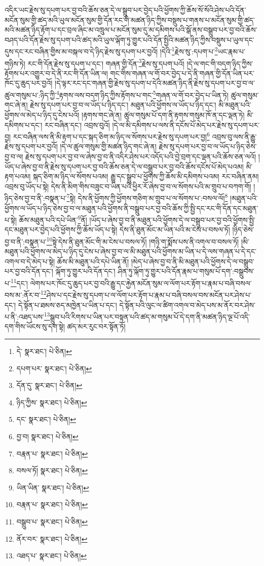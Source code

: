 འདིར་ཡང་རྗེས་སུ་དཔག་པར་བྱ་བའི་ཆོས་ཅན་དེ་ལ་སྒྲུབ་པར་བྱེད་པའི་ཕྱོགས་ཀྱི་ཆོས་སོ་སོའི་ཤེས་པའི་དོན་མངོན་སུམ་གྱི་ཚད་མའི་ཡུལ་མངོན་སུམ་གྱི་དོན་རང་གི་མཚན་ཉིད་ཀྱིས་བསྡུས་པ་གནས་པ་མངོན་སུམ་གྱི་ཚད་མའི་མཚན་ཉིད་རྟོག་པ་དང་བྲལ་ཞིང་མ་འཁྲུལ་པ་མངོན་སུམ་དུ་མ་དམིགས་པའི་སྒོ་ནས་བསྒྲུབ་པར་བྱ་བའི་ཆོས་བཤད་པའི་དོན་རྗེས་སུ་དཔག་པའི་ཚད་མའི་ཡུལ་ལྐོག་ཏུ་གྱུར་པའི་དོན་སྤྱིའི་མཚན་ཉིད་ཀྱིས་བསྡུས་པ་ཡུལ་དང་དུས་དང་རང་བཞིན་གྱིས་མ་བསྐལ་བ་དེ་ཉིད་རྗེས་སུ་དཔག་པར་བྱའོ། །དེའི་\footnote{དེ་  སྣར་ཐང་།  པེ་ཅིན། }རྗེས་སུ་:དཔག་པ་\footnote{དཔག་པར་  སྣར་ཐང་།  པེ་ཅིན། }ཡང་རྣམ་པ་གཉིས་ཏེ། རང་གི་དོན་རྗེས་སུ་དཔག་པ་དང་། གཞན་གྱི་དོན་\footnote{དོན་དུ་  སྣར་ཐང་།  པེ་ཅིན། }རྗེས་སུ་དཔག་པའོ། །དེ་ལ་གང་གི་བདག་ཉིད་ཀྱིས་རྟོགས་པར་འགྱུར་བ་དེ་ནི་རང་གི་དོན་ཡིན་ལ། གང་གིས་གཞན་ལ་གོ་བར་བྱེད་པ་དེ་ནི་གཞན་གྱི་དོན་ཡིན་པར་ཁོང་དུ་ཆུད་པར་བྱའོ། །དེ་ལྟར་རང་དང་གཞན་གྱི་རྗེས་སུ་དཔག་པ་དེའི་མཚན་ཉིད་ནི་རྗེས་སུ་དཔག་པར་བྱ་བ་ལ་ཚུལ་གསུམ་པ་:ཉིད་ཀྱི་\footnote{ཉིད་ཀྱིས་  སྣར་ཐང་།  པེ་ཅིན། }རྟགས་ལས་བདག་ཉིད་ཀྱིས་རྟོགས་པ་གང་\footnote{དང་  སྣར་ཐང་།  པེ་ཅིན། }གཞན་ལ་གོ་བར་བྱེད་པ་ཡིན་ཏེ། ཚུལ་གསུམ་གང་ཞེ་ན། རྗེས་སུ་དཔག་པར་བྱ་བ་ལ་ཡོད་པ་ཉིད་དང་། མཐུན་པའི་ཕྱོགས་ལ་ཡོད་པ་ཉིད་དང་། མི་མཐུན་པའི་ཕྱོགས་ལ་མེད་པ་ཉིད་དུ་ངེས་པའོ། །རྟགས་གང་ཞེ་ན། ཚུལ་གསུམ་པོ་དག་ནི་རྟགས་གསུམ་ཁོ་ན་དང་ལྡན་ཏེ། མི་དམིགས་པ་དང་། རང་བཞིན་དང་། འབྲས་བུའོ། །དེ་ལ་མི་དམིགས་པ་ལས་ནི་དངོས་པོ་མེད་པར་རྗེས་སུ་དཔག་པར་བྱ། རང་བཞིན་ལས་ནི་མི་རྟག་པ་དང་སྐད་ཅིག་མ་ཉིད་ལ་སོགས་པར་རྗེས་སུ་དཔག་པར་བྱ།\footnote{བྱ་བ།  སྣར་ཐང་།  པེ་ཅིན། } འབྲས་བུ་ལས་ནི་རྒྱུ་རྗེས་སུ་དཔག་པར་བྱའོ། །དེ་ལ་ཚུལ་གསུམ་གྱི་མཚན་ཉིད་གང་ཞེ་ན། རྗེས་སུ་དཔག་པར་བྱ་བ་ལ་ཡོད་པ་ཉིད་ཅེས་བྱ་བ་ལ། རྗེས་སུ་དཔག་པར་བྱ་བ་ལ་ཞེས་བྱ་བ་ནི་འདིར་ཤེས་པར་འདོད་པའི་བྱེ་བྲག་དང་ལྡན་པའི་ཆོས་ཅན་ལའོ། །ཡོད་པ་ཞེས་བྱ་བ་ནི་རྗེས་སུ་དཔག་པར་བྱ་བའི་ཆོས་ཅན་དེ་ལ་བསྒྲུབ་པར་བྱ་བའི་ཆོས་དངོས་པོ་མེད་པའམ། མི་རྟག་པའམ། སྐད་ཅིག་མ་ཉིད་ལ་སོགས་པའམ། རྒྱུ་དང་སྒྲུབ་པ་ཕྱོགས་ཀྱི་ཆོས་མི་དམིགས་པའམ། རང་བཞིན་ནམ། འབྲས་བུ་ཡོད་པ་སྟེ། དེས་ནི་མིག་གིས་བཟུང་བ་ཡིན་པའི་ཕྱིར་རོ་ཞེས་བྱ་བ་ལ་སོགས་པའི་མ་གྲུབ་པ་བཀག་གོ། །ཉིད་ཅེས་བྱ་བ་ནི་:བསྣན་པ་\footnote{བརྣན་པ་  སྣར་ཐང་།  པེ་ཅིན། }སྟེ། དེས་ནི་ཕྱོགས་ཀྱི་ཕྱོགས་གཅིག་མ་གྲུབ་པ་ལ་སོགས་པ་:བསལ་ལོ།\footnote{བསལ་ཏོ།  སྣར་ཐང་།  པེ་ཅིན། } །མཐུན་པའི་ཕྱོགས་ལ་ཡོད་པ་ཉིད་ཅེས་བྱ་བ་ལ་མཐུན་པའི་ཕྱོགས་ནི་བསྒྲུབ་པར་བྱ་བའི་ཆོས་ཀྱི་སྤྱི་དང་རང་གི་དོན་དང་མཐུན་པ་སྟེ། ཆོས་མཐུན་པའི་དཔེ་ཡིན་\footnote{ཡིན་ཡིན་  སྣར་ཐང་།  པེ་ཅིན། }ནོ། །ཡོད་པ་ཞེས་བྱ་བ་ནི་མཐུན་པའི་ཕྱོགས་དེ་ལ་བསྒྲུབ་པར་བྱ་བའི་ཕྱོགས་སྤྱི་དང་མཐུན་པར་བྱེད་པའི་ཕྱོགས་ཀྱི་ཆོས་ཡོད་པ་སྟེ། དེས་ནི་ཐུན་མོང་མ་ཡིན་པའི་མ་ངེས་པ་བསལ་ཏོ། །ཉིད་ཅེས་བྱ་བ་ནི་:བསྣན་པ་\footnote{བརྣན་པ་  སྣར་ཐང་།  པེ་ཅིན། }སྟེ་དེས་ནི་ཐུན་མོང་གི་མ་ངེས་པ་བསལ་ཏོ། །གཉི་ག་སྨོས་པས་ནི་འགལ་བ་བསལ་ཏོ། །མི་མཐུན་པའི་ཕྱོགས་ལ་མེད་པ་ཉིད་དུ་ངེས་པ་ཞེས་བྱ་བ་ལ་མི་མཐུན་པའི་ཕྱོགས་མ་ཡིན་པ་དེ་ལས་གཞན་པ་དེ་དང་འགལ་བ་དེ་མེད་པ་སྟེ། ཆོས་མི་མཐུན་པའི་དཔེ་ཡིན་ནོ། །མེད་པ་ཞེས་བྱ་བ་ནི་མི་མཐུན་པའི་ཕྱོགས་དེ་ལ་བསྒྲུབ་པར་བྱ་བའི་དོན་དང་། ལྐོག་ཏུ་གྱུར་པའི་དོན་དང་། ཤིན་ཏུ་ལྐོག་ཏུ་གྱུར་པའི་དོན་རྣམ་པ་གསུམ་པོ་དག་:བསྒྲུབས་པ་\footnote{བསྒྲུབ་པ་  སྣར་ཐང་།  པེ་ཅིན། }དང་། ལེགས་པར་ཁོང་དུ་ཆུད་པར་བྱ་བའི་རྒྱུ་དང་རྐྱེན་མངོན་སུམ་ལ་ལོག་པར་རྟོག་པ་རྣམ་པ་བཞི་བསལ་བས་མ་:ནོར་བ་\footnote{ནོར་བར་  སྣར་ཐང་།  པེ་ཅིན། }ཤེས་པ་དང་རྗེས་སུ་དཔག་པ་ལ་ལོག་པར་རྟོག་པ་རྣམ་པ་བཞི་བསལ་བས་མངོན་པར་ཤེས་པ་དང་། དེ་སྟོན་པ་ཐམས་ཅད་མཁྱེན་པ་ཡིན་པ་དང་། དེ་སྟོན་པའི་ལུང་ལ་ཚིག་འགལ་བ་མེད་པས་མ་ནོར་བར་ཤེས་པ་ནི་:འཐད་པས་\footnote{འཐད་པ་  སྣར་ཐང་།  པེ་ཅིན། }སྒྲུབ་པའི་རིགས་པ་ཡིན་པར་བསྟན་པའི་ཚད་མ་གསུམ་པོ་དེ་དག་ནི་མཚན་ཉིད་ལྔ་པོ་འདི་དག་གིས་ཡོངས་སུ་དག་སྟེ། ཚད་མར་རུང་བར་སྟོན་ཏོ། 